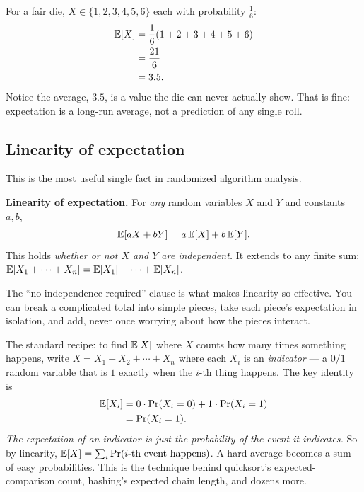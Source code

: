 \begin{example}
\label{ch38:ex-die-exp}
For a fair die, $X \in \{1,2,3,4,5,6\}$ each with probability $\tfrac16$:
\begin{align*}
\mathbb{E}[X] &= \frac{1}{6}(1 + 2 + 3 + 4 + 5 + 6) \\
&= \frac{21}{6} \\
&= 3.5.
\end{align*}
Notice the average, $3.5$, is a value the die can never actually show. That is fine:
expectation is a long-run average, not a prediction of any single roll.
\end{example}

\subsection{Linearity of expectation}

This is the most useful single fact in randomized algorithm analysis.

\begin{formalbox}
\textbf{Linearity of expectation.} For \emph{any} random variables $X$ and $Y$ and
constants $a, b$,
\[
\mathbb{E}[aX + bY] = a\,\mathbb{E}[X] + b\,\mathbb{E}[Y].
\]
This holds \emph{whether or not $X$ and $Y$ are independent.} It extends to any finite
sum: $\mathbb{E}[X_1 + \cdots + X_n] = \mathbb{E}[X_1] + \cdots + \mathbb{E}[X_n]$.
\end{formalbox}

The ``no independence required'' clause is what makes linearity so effective. You can break
a complicated total into simple pieces, take each piece's expectation in
isolation, and add, never once worrying about how the pieces interact.

\begin{focusbox}
The standard recipe: to find $\mathbb{E}[X]$ where $X$ counts how many times something
happens, write $X = X_1 + X_2 + \cdots + X_n$ where each $X_i$ is an \emph{indicator}
--- a $0/1$ random variable that is $1$ exactly when the $i$-th thing happens. The key
identity is
\begin{align*}
\mathbb{E}[X_i] &= 0 \cdot \Pr(X_i = 0) + 1 \cdot \Pr(X_i = 1) \\
&= \Pr(X_i = 1).
\end{align*}
\emph{The expectation of an indicator is just the probability of the event it
indicates.} So by linearity, $\mathbb{E}[X] = \sum_i \Pr(\text{$i$-th event happens})$. A hard
average becomes a sum of easy probabilities. This is the technique behind
quicksort's expected-comparison count, hashing's expected chain length, and dozens
more.
\end{focusbox}

